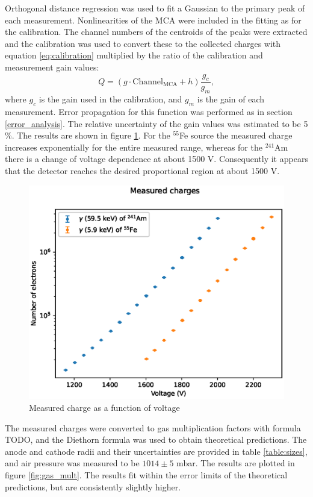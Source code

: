 \documentclass[a4paper]{article}
\begin{document}
Orthogonal distance regression was used to fit a Gaussian to the primary peak of each measurement.
Nonlinearities of the MCA were included in the fitting as for the calibration.
The channel numbers of the centroids of the peaks were extracted and the calibration was used to convert these to the collected charges with equation \ref{eq:calibration} multiplied by the ratio of the calibration and measurement gain values:
\begin{equation}
Q = (g \cdot \text{Channel}_\text{MCA} + h) \frac{g_c}{g_m},
\end{equation}
where $g_c$ is the gain used in the calibration, and $g_m$ is the gain of each measurement.
Error propagation for this function was performed as in section \ref{error_analysis}.
The relative uncertainty of the gain values was estimated to be 5 \%.
The results are shown in figure \ref{fig:hv_scans}.
For the $^{55}$Fe source the measured charge increases exponentially for the entire measured range, whereas for the $^{241}$Am there is a change of voltage dependence at about 1500 V.
Consequently it appears that the detector reaches the desired proportional region at about 1500 V.

\begin{figure}[ht!]
\centering
\includegraphics[width=\textwidth]{fig/python/hv_scans.eps}
\caption{Measured charge as a function of voltage}
\label{fig:hv_scans}
\end{figure}

\FloatBarrier
The measured charges were converted to gas multiplication factors with formula TODO, and the Diethorn formula was used to obtain theoretical predictions.
The anode and cathode radii and their uncertainties are provided in table \ref{table:sizes}, and air pressure was measured to be $1014 \pm 5$ mbar.
The results are plotted in figure \ref{fig:gas_mult}.
The results fit within the error limits of the theoretical predictions, but are consistently slightly higher.
\end{document}
